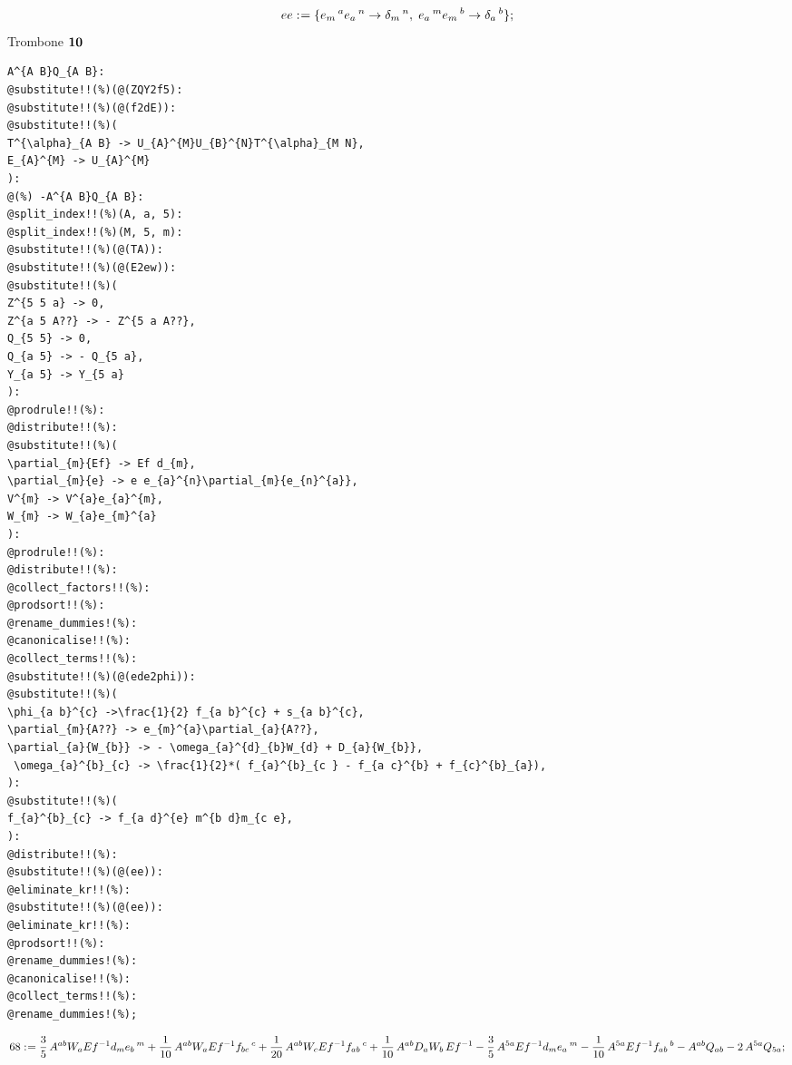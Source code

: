 \documentclass[11pt]{article}
\def\specialcolon{\mathrel{\mathop{:}}\hspace{-.5em}}
\begin{document}
\begin{dmath*}[compact, spread=2pt]
ee\specialcolon{}= \{{e}_{m}\,^{a} {e}_{a}\,^{n} \rightarrow {\delta}_{m}\,^{n},\; {e}_{a}\,^{m} {e}_{m}\,^{b} \rightarrow {\delta}_{a}\,^{b}\};
\end{dmath*}
Trombone $\bf 10$
{\color[named]{Blue}\begin{verbatim}
A^{A B}Q_{A B}:
@substitute!!(%)(@(ZQY2f5):
@substitute!!(%)(@(f2dE)):
@substitute!!(%)(
T^{\alpha}_{A B} -> U_{A}^{M}U_{B}^{N}T^{\alpha}_{M N},
E_{A}^{M} -> U_{A}^{M}
):
@(%) -A^{A B}Q_{A B}:
@split_index!!(%)(A, a, 5):
@split_index!!(%)(M, 5, m):
@substitute!!(%)(@(TA)):
@substitute!!(%)(@(E2ew)):
@substitute!!(%)(
Z^{5 5 a} -> 0,
Z^{a 5 A??} -> - Z^{5 a A??},
Q_{5 5} -> 0,
Q_{a 5} -> - Q_{5 a},
Y_{a 5} -> Y_{5 a}
):
@prodrule!!(%):
@distribute!!(%):
@substitute!!(%)(
\partial_{m}{Ef} -> Ef d_{m},
\partial_{m}{e} -> e e_{a}^{n}\partial_{m}{e_{n}^{a}},
V^{m} -> V^{a}e_{a}^{m},
W_{m} -> W_{a}e_{m}^{a}
):
@prodrule!!(%):
@distribute!!(%):
@collect_factors!!(%):
@prodsort!!(%):
@rename_dummies!(%):
@canonicalise!!(%):
@collect_terms!!(%):
@substitute!!(%)(@(ede2phi)):
@substitute!!(%)(
\phi_{a b}^{c} ->\frac{1}{2} f_{a b}^{c} + s_{a b}^{c},
\partial_{m}{A??} -> e_{m}^{a}\partial_{a}{A??},
\partial_{a}{W_{b}} -> - \omega_{a}^{d}_{b}W_{d} + D_{a}{W_{b}},
 \omega_{a}^{b}_{c} -> \frac{1}{2}*( f_{a}^{b}_{c } - f_{a c}^{b} + f_{c}^{b}_{a}),
):
@substitute!!(%)(
f_{a}^{b}_{c} -> f_{a d}^{e} m^{b d}m_{c e},
):
@distribute!!(%):
@substitute!!(%)(@(ee)):
@eliminate_kr!!(%):
@substitute!!(%)(@(ee)):
@eliminate_kr!!(%):
@prodsort!!(%):
@rename_dummies!(%):
@canonicalise!!(%):
@collect_terms!!(%):
@rename_dummies!(%);
\end{verbatim}}
\begin{dmath*}[compact, spread=2pt]
68\specialcolon{}= \frac{3}{5}\, {A}^{a b} {W}_{a} Ef{}^{-1} {d}_{m} {e}_{b}\,^{m} + \frac{1}{10}\, {A}^{a b} {W}_{a} Ef{}^{-1} {f}_{b c}\,^{c} + \frac{1}{20}\, {A}^{a b} {W}_{c} Ef{}^{-1} {f}_{a b}\,^{c} + \frac{1}{10}\, {A}^{a b} {D}_{a}{{W}_{b}}\,  Ef{}^{-1} - \frac{3}{5}\, {A}^{5 a} Ef{}^{-1} {d}_{m} {e}_{a}\,^{m} - \frac{1}{10}\, {A}^{5 a} Ef{}^{-1} {f}_{a b}\,^{b} - {A}^{a b} {Q}_{a b} - 2\, {A}^{5 a} {Q}_{5 a};
\end{dmath*}
\end{document}
